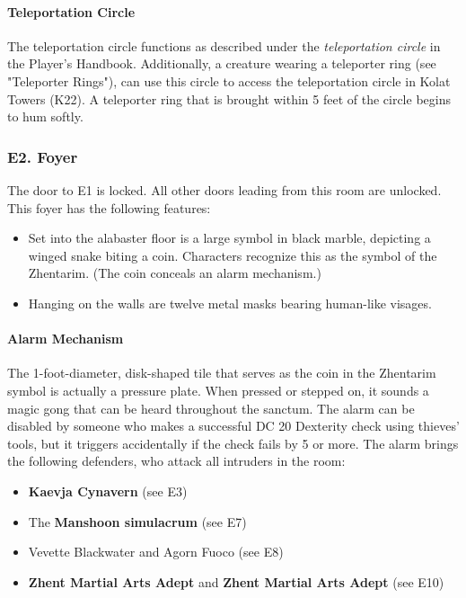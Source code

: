\documentclass[10pt,a4paper,twoside,twocolumn,openany,nodeprecatedcode]{dndbook}
\begin{document}
\paragraph{Teleportation Circle}
The teleportation circle functions as described under the \textit{teleportation circle} in the Player's Handbook. Additionally, a creature wearing a teleporter ring (see "Teleporter Rings"), can use this circle to access the teleportation circle in Kolat Towers (K22). A teleporter ring that is brought within 5 feet of the circle begins to hum softly.
\subsubsection{E2. Foyer}
The door to E1 is locked. All other doors leading from this room are unlocked. This foyer has the following features:
\begin{itemize}

\item Set into the alabaster floor is a large symbol in black marble, depicting a winged snake biting a coin. Characters recognize this as the symbol of the Zhentarim. (The coin conceals an alarm mechanism.)
\item Hanging on the walls are twelve metal masks bearing human-like visages.
\end{itemize}


\paragraph{Alarm Mechanism}
The 1-foot-diameter, disk-shaped tile that serves as the coin in the Zhentarim symbol is actually a pressure plate. When pressed or stepped on, it sounds a magic gong that can be heard throughout the sanctum. The alarm can be disabled by someone who makes a successful DC 20 Dexterity check using thieves' tools, but it triggers accidentally if the check fails by 5 or more. The alarm brings the following defenders, who attack all intruders in the room:
\begin{itemize}

\item \textbf{Kaevja Cynavern} (see E3)
\item The \textbf{Manshoon simulacrum} (see E7)
\item Vevette Blackwater and Agorn Fuoco (see E8)
\item \textbf{Zhent Martial Arts Adept} and \textbf{Zhent Martial Arts Adept} (see E10)
\end{itemize}
\end{document}
